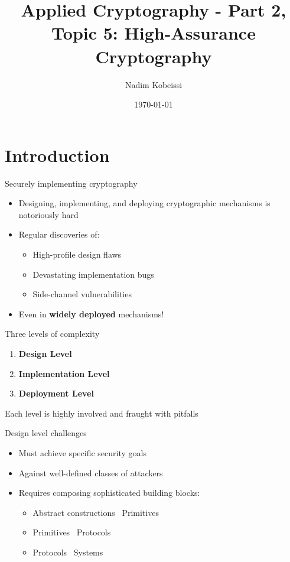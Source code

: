 \documentclass[aspectratio=169, lualatex, handout]{beamer}
\title{Applied Cryptography - Part 2, Topic 5: High-Assurance Cryptography}
\author{Nadim Kobeissi}
\institute{American University of Beirut}
\date{\today}
\begin{document}
\begin{frame}[plain]
	\titlepage
\end{frame}

\section{Introduction}

\begin{frame}{Securely implementing cryptography}
	\begin{itemize}
		\item Designing, implementing, and deploying cryptographic mechanisms is notoriously hard
		\item Regular discoveries of:
		      \begin{itemize}
			      \item High-profile design flaws
			      \item Devastating implementation bugs
			      \item Side-channel vulnerabilities
		      \end{itemize}
		\item Even in \textbf{widely deployed} mechanisms!
	\end{itemize}
\end{frame}

\begin{frame}{Three levels of complexity}
	\begin{center}
		\Large
		\begin{enumerate}
			\item \textbf{Design Level}
			\item \textbf{Implementation Level}
			\item \textbf{Deployment Level}
		\end{enumerate}
		\vspace{1em}
		\normalsize
		Each level is highly involved and fraught with pitfalls
	\end{center}
\end{frame}

\begin{frame}{Design level challenges}
	\begin{itemize}
		\item Must achieve specific security goals
		\item Against well-defined classes of attackers
		\item Requires composing sophisticated building blocks:
		      \begin{itemize}
			      \item Abstract constructions \rightarrow\ Primitives
			      \item Primitives \rightarrow\ Protocols
			      \item Protocols \rightarrow\ Systems
		      \end{itemize}
	\end{itemize}
\end{frame}
\end{document}
